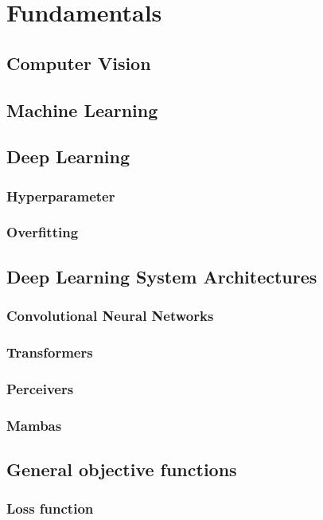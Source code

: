 \chapter{Fundamentals}
\label{ch:fundamentals}

\section{Computer Vision}
\section{Machine Learning}
\section{Deep Learning}
\subsection{Hyperparameter}
\subsection{Overfitting}

\section{Deep Learning System Architectures}
\subsection{Convolutional Neural Networks}
\subsection{Transformers}
\subsection{Perceivers}
\subsection{Mambas}


\section{General objective functions}
\subsection{Loss function}
